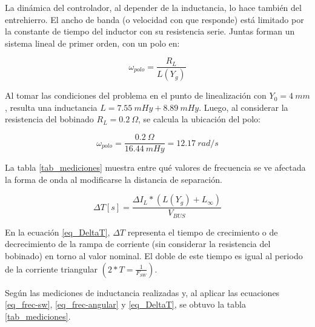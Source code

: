 \noindent La dinámica del controlador, al depender de la inductancia, lo hace también del entrehierro. El ancho de banda (o velocidad con que responde) está limitado por la constante de tiempo del inductor con su resistencia serie. Juntas forman un sistema lineal de primer orden, con un polo en: 

\begin{equation} \label{eq_frec-angular}
\omega _{polo} = \frac{R_L}{L(Y_g)}
\end{equation}

\noindent Al tomar las condiciones del problema en el punto de linealización con $Y_{0}=4\:mm$, resulta una inductancia $L = 7.55 \:mHy + 8.89 \:mHy$. Luego, al considerar la resistencia del bobinado $R_L=0.2\:\Omega$, se calcula la ubicación del polo:

\begin{equation} 
\omega _{polo} = \frac{0.2\:\Omega}{16.44 \:mHy} = 12.17 \:rad/s
\end{equation}

\noindent La tabla \ref{tab_mediciones} muestra  entre qué valores de frecuencia se ve afectada la forma de onda al modificarse la distancia de separación.

\begin{equation} \label{eq_DeltaT}
\Delta T [s] = \frac{\Delta I_L * (L(Y_g) + L_{\infty})}{V_{BUS}}
\end{equation}

\noindent En la ecuación \ref{eq_DeltaT}, $\Delta T$ representa el tiempo de crecimiento o de decrecimiento de la rampa de corriente (sin considerar la resistencia del bobinado) en torno al valor nominal. El doble de este tiempo es igual al periodo de la corriente triangular $(2*T=\frac{1}{F_{SW}})$.

\noindent Según las mediciones de inductancia realizadas y, al aplicar las ecuaciones \ref{eq_frec-sw}, \ref{eq_frec-angular} y \ref{eq_DeltaT}, se obtuvo la tabla \ref{tab_mediciones}.


